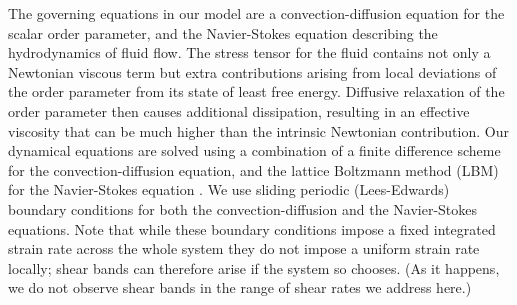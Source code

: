 \documentclass[8.5pt,twoside,twocolumn]{article}
\begin{document}
The governing equations in our model are a convection-diffusion equation
for the scalar order parameter, and the Navier-Stokes equation describing
the hydrodynamics of fluid flow. The stress tensor for the fluid contains not only a Newtonian viscous term but extra contributions arising from local deviations of the order parameter from its state of least free energy. Diffusive relaxation of the order parameter then causes additional dissipation, resulting in an effective viscosity that can be much higher than the intrinsic Newtonian contribution.
Our dynamical equations are solved using a combination of a finite
difference scheme for the convection-diffusion equation, and the
lattice Boltzmann method (LBM)~\cite{Succi} for the Navier-Stokes equation \cite{Marenduzzo07, Henrich10a,  Henrich10b, Henrich11a,Gonnella97}.
We use sliding periodic (Lees-Edwards) boundary conditions for
both the convection-diffusion and the Navier-Stokes equations. Note that while these boundary conditions impose a fixed integrated strain rate across the whole system they do not impose a uniform strain rate locally; shear bands can therefore arise if the system so chooses. (As it happens, we do not observe shear bands in the range of shear rates we address here.)





\end{document}

